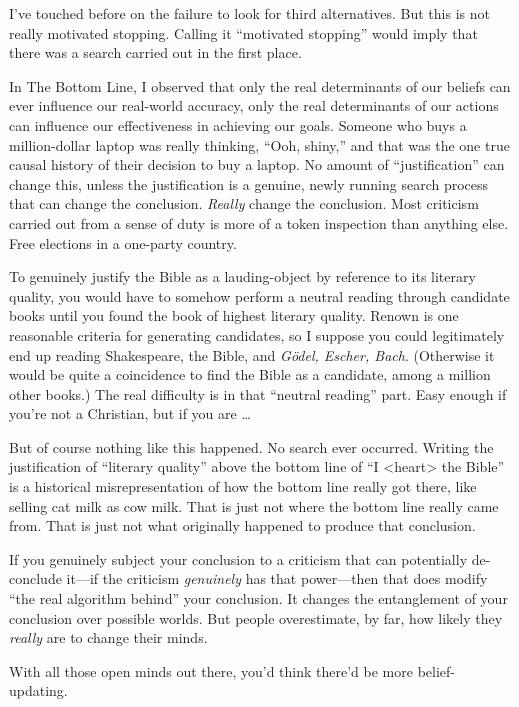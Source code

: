 {
 I've touched before on the failure to look for
third alternatives. But this is not really motivated stopping. Calling
it ``motivated stopping'' would
imply that there was a search carried out in the first place.}

{
 In The Bottom Line, I observed that only the real determinants of
our beliefs can ever influence our real-world accuracy, only the real
determinants of our actions can influence our effectiveness in
achieving our goals. Someone who buys a million-dollar laptop was
really thinking, ``Ooh, shiny,'' and
that was the one true causal history of their decision to buy a laptop.
No amount of ``justification'' can
change this, unless the justification is a genuine, newly running
search process that can change the conclusion. \textit{Really} change
the conclusion. Most criticism carried out from a sense of duty is more
of a token inspection than anything else. Free elections in a one-party
country.}

{
 To genuinely justify the Bible as a lauding-object by reference to
its literary quality, you would have to somehow perform a neutral
reading through candidate books until you found the book of highest
literary quality. Renown is one reasonable criteria for generating
candidates, so I suppose you could legitimately end up reading
Shakespeare, the Bible, and \textit{Gödel, Escher, Bach}. (Otherwise it
would be quite a coincidence to find the Bible as a candidate, among a
million other books.) The real difficulty is in that
``neutral reading'' part. Easy
enough if you're not a Christian, but if you are \ldots}

{
 But of course nothing like this happened. No search ever occurred.
Writing the justification of ``literary
quality'' above the bottom line of
``I {\textless}heart{\textgreater} the
Bible'' is a historical misrepresentation of how the
bottom line really got there, like selling cat milk as cow milk. That
is just not where the bottom line really came from. That is just not
what originally happened to produce that conclusion.}

{
 If you genuinely subject your conclusion to a criticism that can
potentially de-conclude it---if the criticism \textit{genuinely} has
that power---then that does modify ``the real
algorithm behind'' your conclusion. It changes the
entanglement of your conclusion over possible worlds. But people
overestimate, by far, how likely they \textit{really} are to change
their minds.}

{
 With all those open minds out there, you'd think
there'd be more belief-updating.}


